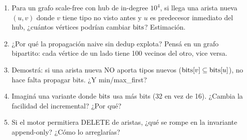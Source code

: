 \begin{ejercicios}
\begin{enumerate}
    \item \starred{} Para un grafo scale-free con hub de
    in-degree \(10^4\), si llega una arista nueva \((u, v)\)
    donde \(v\) tiene tipo no visto antes y \(u\) es predecesor
    inmediato del hub, ¿cuántos vértices podrían cambiar
    \(\mathrm{bits}\)? Estimación.

    \item ¿Por qué la propagación naive sin dedup explota? Pensá
    en un grafo bipartito: cada vértice de un lado tiene 100
    vecinos del otro, vice versa.

    \item \starred{} Demostrá: si una arista nueva NO aporta tipos
    nuevos (\(\mathrm{bits}[v] \subseteq \mathrm{bits}[u]\)), no hace falta
    propagar bits. ¿Y min/max\_first?

    \item Imaginá una variante donde \(\mathrm{bits}\) usa más bits (32 en
    vez de 16). ¿Cambia la facilidad del incremental? ¿Por qué?

    \item Si el motor permitiera DELETE de aristas, ¿qué se rompe
    en la invariante append-only? ¿Cómo lo arreglarías?
\end{enumerate}
\end{ejercicios}
